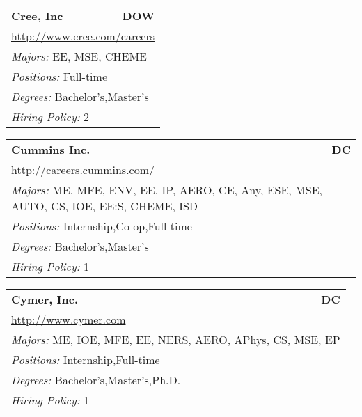 \documentclass[twoside]{article}
\begin{document}
\begin{center}
\begin{multicols}{3}
\begin{FlushLeft}
\begin{minipage}{\columnwidth}
\end{minipage}
 
\begin{minipage}{\columnwidth}\begin{tabularx}{.95\columnwidth}{Xr}
                 {\Large\bf Cree, Inc} & {\Large\bf DOW}\\
    \multicolumn{2}{p{.95\columnwidth}}{\url{http://www.cree.com/careers}}\\
    \multicolumn{2}{p{.95\columnwidth}}{\emph{Majors:} EE, MSE, CHEME}\\
    \multicolumn{2}{p{.95\columnwidth}}{\emph{Positions:} Full-time}\\
    \multicolumn{2}{p{.95\columnwidth}}{\emph{Degrees:} Bachelor's,Master's}\\
    \multicolumn{2}{p{.95\columnwidth}}{\emph{Hiring Policy:} 2}\\
    \end{tabularx}
    
\end{minipage}
 
\begin{minipage}{\columnwidth}\begin{tabularx}{.95\columnwidth}{Xr}
                 {\Large\bf Cummins Inc.} & {\Large\bf DC}\\
    \multicolumn{2}{p{.95\columnwidth}}{\url{http://careers.cummins.com/}}\\
    \multicolumn{2}{p{.95\columnwidth}}{\emph{Majors:} ME, MFE, ENV, EE, IP, AERO, CE, Any, ESE, MSE, AUTO, CS, IOE, EE:S, CHEME, ISD}\\
    \multicolumn{2}{p{.95\columnwidth}}{\emph{Positions:} Internship,Co-op,Full-time}\\
    \multicolumn{2}{p{.95\columnwidth}}{\emph{Degrees:} Bachelor's,Master's}\\
    \multicolumn{2}{p{.95\columnwidth}}{\emph{Hiring Policy:} 1}\\
    \end{tabularx}
    
\end{minipage}
 
\begin{minipage}{\columnwidth}\begin{tabularx}{.95\columnwidth}{Xr}
                 {\Large\bf Cymer, Inc.} & {\Large\bf DC}\\
    \multicolumn{2}{p{.95\columnwidth}}{\url{http://www.cymer.com}}\\
    \multicolumn{2}{p{.95\columnwidth}}{\emph{Majors:} ME, IOE, MFE, EE, NERS, AERO, APhys, CS, MSE, EP}\\
    \multicolumn{2}{p{.95\columnwidth}}{\emph{Positions:} Internship,Full-time}\\
    \multicolumn{2}{p{.95\columnwidth}}{\emph{Degrees:} Bachelor's,Master's,Ph.D.}\\
    \multicolumn{2}{p{.95\columnwidth}}{\emph{Hiring Policy:} 1}\\
    \end{tabularx}
    

\end{minipage}
\end{FlushLeft}
\end{multicols}
\end{center}
\end{document}

